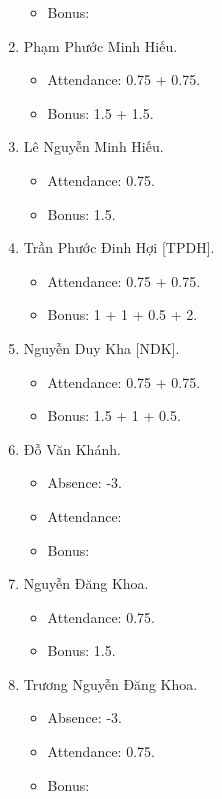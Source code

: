 \documentclass{article}
\begin{document}
\begin{enumerate}
\begin{itemize}
        \item Bonus:
    \end{itemize}
    \item {\sc Phạm Phước Minh Hiếu.}
    \begin{itemize}
        \item Attendance: 0.75 + 0.75.
        \item Bonus: 1.5 + 1.5.
    \end{itemize}
    \item {\sc Lê Nguyễn Minh Hiếu.}
    \begin{itemize}
        \item Attendance: 0.75.
        \item Bonus: 1.5.
    \end{itemize}
    \item {\sc Trần Phước Đinh Hợi [TPDH].}
    \begin{itemize}
        \item Attendance: 0.75 + 0.75.
        \item Bonus: 1 + 1 + 0.5 + 2.
    \end{itemize}
    \item {\sc Nguyễn Duy Kha [NDK].}
    \begin{itemize}
        \item Attendance: 0.75 + 0.75.
        \item Bonus: 1.5 + 1 + 0.5.
    \end{itemize}
    \item {\sc Đỗ Văn Khánh.}
    \begin{itemize}
        \item Absence: -3.
        \item Attendance:
        \item Bonus:
    \end{itemize}
    \item {\sc Nguyễn Đăng Khoa.}
    \begin{itemize}
        \item Attendance: 0.75.
        \item Bonus: 1.5.
    \end{itemize}
    \item {\sc Trương Nguyễn Đăng Khoa.}
    \begin{itemize}
        \item Absence: -3.
        \item Attendance: 0.75.
        \item Bonus:
    \end{itemize}

\end{enumerate}
\end{document}
